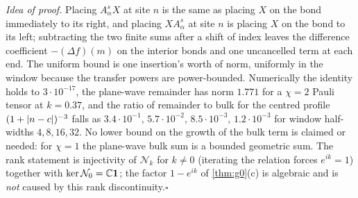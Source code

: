 \smallskip\noindent\textit{Idea of proof.}
Placing $A_\alpha^sX$ at site $n$ is the same as placing $X$ on the bond
immediately to its right, and placing $XA_\alpha^s$ at site $n$ is placing $X$ on
the bond to its left; subtracting the two finite sums after a shift of index
leaves the difference coefficient $-(\Delta f)(m)$ on the interior bonds and one
uncancelled term at each end.  The uniform bound is one insertion's worth of
norm, uniformly in the window because the transfer powers are power-bounded.
Numerically the identity holds to $3\cdot10^{-17}$, the plane-wave remainder has
norm $1.771$ for a $\chi=2$ Pauli tensor at $k=0.37$, and the ratio of remainder
to bulk for the centred profile $(1+\lvert n-c\rvert)^{-3}$ falls as
$3.4\cdot10^{-1},\,5.7\cdot10^{-2},\,8.5\cdot10^{-3},\,1.2\cdot10^{-3}$ for
window half-widths $4,8,16,32$.  No lower bound on the growth of the bulk term is
claimed or needed: for $\chi=1$ the plane-wave bulk sum is a bounded geometric
sum.  The rank statement is injectivity of $\mathcal{N}_k$ for $k\neq0$ (iterating
the relation forces $e^{ik}=1$) together with $\ker\mathcal{N}_0=\mathbb{C}\mathbf{1}$;
the factor $1-e^{ik}$ of \cref{thm:g0}(c) is algebraic and is \emph{not} caused by
this rank discontinuity.\hfill$\square$

